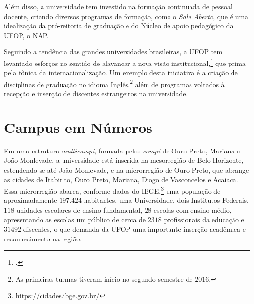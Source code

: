 \documentclass[
	12pt,				%
	openright,			%
	oneside,			%
	a4paper,			%
	english,			%
	brazil				%
	]{abntex2}
\begin{document}
Além disso, a universidade tem investido na formação continuada de pessoal docente, criando diversos programas de formação, como o \textit{Sala Aberta}, que é uma idealização da pró-reitoria de graduação e do Núcleo de apoio pedagógico da UFOP, o NAP.

Seguindo a tendência das grandes universidades brasileiras, a UFOP tem levantado esforços no sentido de alavancar a nova visão institucional,\footcite{PDI-UFOP} que prima pela tônica da internacionalização. Um exemplo desta iniciativa é a criação de disciplinas de graduação no idioma Inglês,\footnote{As primeiras turmas tiveram início no segundo semestre de $2016$.} além de programas voltados à recepção e inserção de discentes estrangeiros na universidade. %
%
%

\section{Campus em Números}
%
Em uma estrutura \textit{multicampi}, formada pelos \textit{campi} de Ouro Preto, Mariana e João Monlevade, a universidade está inserida na mesorregião de Belo Horizonte, estendendo-se até João Monlevade, e na microrregião de Ouro Preto, que abrange as cidades de Itabirito, Ouro Preto, Mariana, Diogo de Vasconcelos e Acaiaca. Essa microrregião abarca, conforme dados do IBGE,\footnote{\url{https://cidades.ibge.gov.br/}} uma população de aproximadamente $197.424$ habitantes, uma Universidade, dois Institutos Federais, $118$ unidades escolares de ensino fundamental, $28$ escolas com ensino médio, apresentando as escolas um público de cerca de $2318$ profissionais da educação e $31492$ discentes, o que demanda da UFOP uma importante inserção acadêmica e reconhecimento na região.
\end{document}
